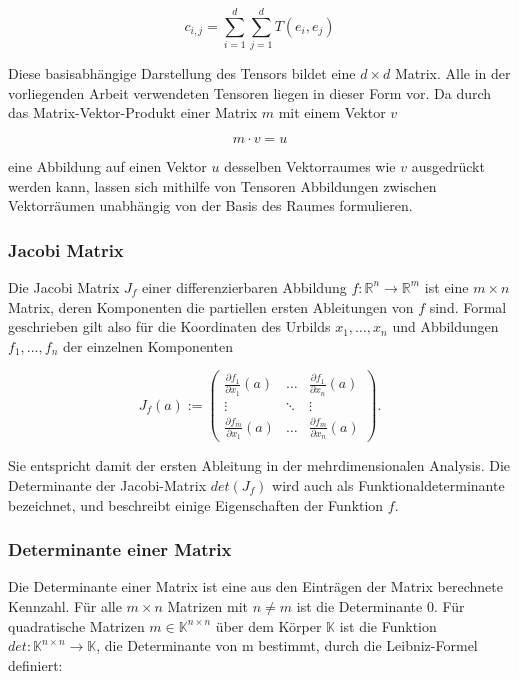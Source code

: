 \documentclass[a4paper,fontsize=12pt,toc=bib,parskip=half,ngerman]{scrartcl}
\begin{document}
\begin{equation}
	c_{i,j} = \sum_{i=1}^{d} \sum_{j=1}^{d} T(e_i, e_j)
\end{equation}

Diese basisabh\"angige Darstellung des Tensors bildet eine $d\times d$ Matrix. Alle in der vorliegenden Arbeit verwendeten Tensoren liegen in dieser Form vor. Da durch das Matrix-Vektor-Produkt einer Matrix $m$ mit einem Vektor $v$

\begin{equation}
	m \cdot v = u
\end{equation} 

eine Abbildung auf einen Vektor $u$ desselben Vektorraumes wie $v$ ausgedr\"uckt werden kann, lassen sich mithilfe von Tensoren Abbildungen zwischen Vektorr\"aumen unabh\"angig von der Basis des Raumes formulieren.

\subsubsection{Jacobi Matrix}
Die Jacobi Matrix $J_f$ einer differenzierbaren Abbildung $f: \mathbb{R}^n \rightarrow \mathbb{R}^m$ ist eine $m \times n$ Matrix, deren Komponenten die partiellen ersten Ableitungen von $f$ sind. Formal geschrieben gilt also f\"ur die Koordinaten des Urbilds $x_1, \dots, x_n$ und Abbildungen $f_1, ..., f_n$ der einzelnen Komponenten

\begin{equation}
J_f(a) := 
\begin{pmatrix}
\frac{\partial f_1}{\partial x_1}(a) & \dots & \frac{\partial f_1}{\partial x_n}(a)  \\
\vdots & \ddots & \vdots \\
\frac{\partial f_m}{\partial x_1}(a) & \dots & \frac{\partial f_m}{\partial x_n}(a) 
\end{pmatrix}.
\end{equation}

Sie entspricht damit der ersten Ableitung in der mehrdimensionalen Analysis. Die Determinante der Jacobi-Matrix $det(J_f)$ wird auch als Funktionaldeterminante bezeichnet, und beschreibt einige Eigenschaften der Funktion $f$. 

\subsubsection{Determinante einer Matrix}
Die Determinante einer Matrix ist eine aus den Eintr\"agen der Matrix berechnete Kennzahl. F\"ur alle $m\times n$ Matrizen mit $n \neq m$ ist die Determinante 0. F\"ur quadratische Matrizen $m \in \mathbb{K}^{n\times n}$ \"uber dem K\"orper $\mathbb{K}$ ist die Funktion $det: \mathbb{K}^{n\times n} \rightarrow \mathbb{K}$, die Determinante von m bestimmt, durch die Leibniz-Formel definiert:
\end{document}
